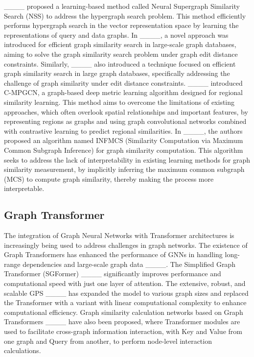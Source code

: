____ proposed a learning-based method called Neural Supergraph Similarity Search (NSS) to address the hypergraph search problem. This method efficiently performs hypergraph search in the vector representation space by learning the representations of query and data graphs. In ____, a novel approach was introduced for efficient graph similarity search in large-scale graph databases, aiming to solve the graph similarity search problem under graph edit distance constraints. Similarly, ____ also introduced a technique focused on efficient graph similarity search in large graph databases, specifically addressing the challenge of graph similarity under edit distance constraints. ____ introduced C-MPGCN, a graph-based deep metric learning algorithm designed for regional similarity learning. This method aims to overcome the limitations of existing approaches, which often overlook spatial relationships and important features, by representing regions as graphs and using graph convolutional networks combined with contrastive learning to predict regional similarities. In ____, the authors proposed an algorithm named INFMCS (Similarity Computation via Maximum Common Subgraph Inference) for graph similarity computation. This algorithm seeks to address the lack of interpretability in existing learning methods for graph similarity measurement, by implicitly inferring the maximum common subgraph (MCS) to compute graph similarity, thereby making the process more interpretable.

\subsection{Graph Transformer}
The integration of Graph Neural Networks with Transformer architectures is increasingly being used to address challenges in graph networks. The existence of Graph Transformers has enhanced the performance of GNNs in handling long-range dependencies and large-scale graph data ____. The Simplified Graph Transformer (SGFormer) ____ significantly improves performance and computational speed with just one layer of attention. The extensive, robust, and scalable GPS ____ has expanded the model to various graph sizes and replaced the Transformer with a variant with linear computational complexity to enhance computational efficiency. Graph similarity calculation networks based on Graph Transformers ____ have also been proposed, where Transformer modules are used to facilitate cross-graph information interaction, with Key and Value from one graph and Query from another, to perform node-level interaction calculations.